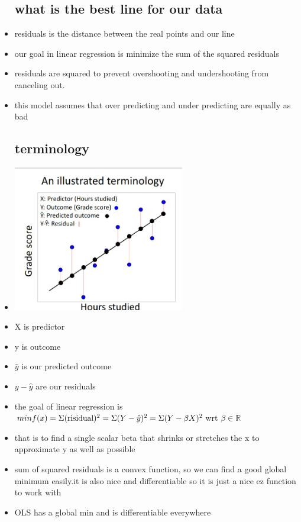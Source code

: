 \documentclass{article}
\begin{document}
\begin{itemize}
\subsection{what is the best line for our data}
\item residuals is the distance between the real points and our line 
\item our goal in linear regression is minimize the sum of the squared residuals 
\item residuals are squared to prevent overshooting and undershooting from canceling out. 
\item this model assumes that over predicting and under predicting are equally as bad 
\subsection{terminology}

\item \includegraphics[width=7.5cm]{Final_Review/lecture_9/reg terminology .jpg}
\item X is predictor 
\item y is outcome 
\item $\hat{y}$ is our predicted outcome 
\item $y-\hat{y}$ are our residuals 
\item the goal of linear regression is $min f(x)=\Sigma(\text{risidual})^2\\=\Sigma(Y-\hat{y})^2=\Sigma(Y-\beta X)^2 $wrt $\beta \in \mathbb{R}$  
\item that is to find a single scalar beta that shrinks or stretches the x to approximate y as well as possible 
\item sum of squared residuals is a convex function, so we can find a good global minimum easily.it is also nice and differentiable so it is just a nice ez function to work with 
\item OLS has a global min and is differentiable everywhere 

\end{itemize}
\end{document}
